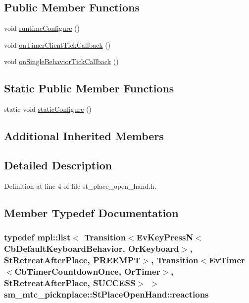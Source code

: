 \subsection*{Public Member Functions}
\begin{DoxyCompactItemize}
\item 
void \hyperlink{structsm__mtc__picknplace_1_1StPlaceOpenHand_a74f0473c51a5203259f0a22ce4834724}{runtime\+Configure} ()
\item 
void \hyperlink{structsm__mtc__picknplace_1_1StPlaceOpenHand_a25a16ee3729d36f981451bbca870b0af}{on\+Timer\+Client\+Tick\+Callback} ()
\item 
void \hyperlink{structsm__mtc__picknplace_1_1StPlaceOpenHand_a2f067bfd77400d702dbfbfaae5577a10}{on\+Single\+Behavior\+Tick\+Callback} ()
\end{DoxyCompactItemize}
\subsection*{Static Public Member Functions}
\begin{DoxyCompactItemize}
\item 
static void \hyperlink{structsm__mtc__picknplace_1_1StPlaceOpenHand_a81b52d02922373dafd311faa2695ef2b}{static\+Configure} ()
\end{DoxyCompactItemize}
\subsection*{Additional Inherited Members}


\subsection{Detailed Description}


Definition at line 4 of file st\+\_\+place\+\_\+open\+\_\+hand.\+h.



\subsection{Member Typedef Documentation}
\subsubsection[{\texorpdfstring{reactions}{reactions}}]{\setlength{\rightskip}{0pt plus 5cm}typedef mpl\+::list$<$ Transition$<$Ev\+Key\+PressN$<$Cb\+Default\+Keyboard\+Behavior, {\bf Or\+Keyboard}$>$, {\bf St\+Retreat\+After\+Place}, {\bf P\+R\+E\+E\+M\+PT}$>$, Transition$<$Ev\+Timer$<$Cb\+Timer\+Countdown\+Once, {\bf Or\+Timer}$>$, {\bf St\+Retreat\+After\+Place}, {\bf S\+U\+C\+C\+E\+SS}$>$ $>$ {\bf sm\+\_\+mtc\+\_\+picknplace\+::\+St\+Place\+Open\+Hand\+::reactions}}\hypertarget{structsm__mtc__picknplace_1_1StPlaceOpenHand_a4b0ae9df1faa97e8f298a19ef19c3f32}{}\label{structsm__mtc__picknplace_1_1StPlaceOpenHand_a4b0ae9df1faa97e8f298a19ef19c3f32}


